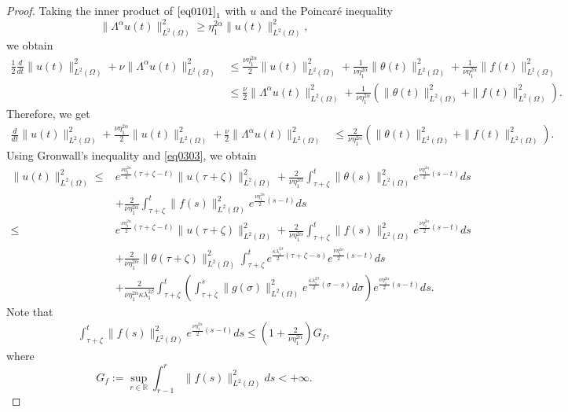 \documentclass[10pt,a4paper]{amsart}
\begin{document}
\begin{proof}
Taking the inner product of $\eqref{eq0101}_{1}$ with $u$ and the Poincar\'{e} inequality
$$\| \Lambda^\alpha u(t)\|_{L^2(\Omega)}^2 \geq \eta_1^{2\alpha}\|u(t)\|_{L^2(\Omega)}^2, $$
we obtain
\begin{align*}
   \frac{1}{2}\frac{d}{dt}\|u(t)\|_{L^2(\Omega)}^2 + \nu\|\Lambda^\alpha u(t)\|_{L^2(\Omega)}^2
   & \leq \frac{\nu\eta_1^{2\alpha}}{2} \|u(t)\|_{L^2(\Omega)}^2 + \frac{1}{\nu\eta_1^{2\alpha}} \|\theta(t)\|_{L^2(\Omega)}^2 + \frac{1}{\nu\eta_1^{2\alpha}} \|f(t)\|_{L^2(\Omega)}^2 \\
   & \leq \frac{\nu}{2} \|\Lambda^\alpha u(t)\|_{L^2(\Omega)}^2 + \frac{1}{\nu\eta_1^{2\alpha}} \left( \|\theta(t)\|_{L^2(\Omega)}^2 +    \|f(t)\|_{L^2(\Omega)}^2 \right).
\end{align*}
Therefore, we get
\begin{align}\label{eq0304}
   \frac{d}{dt}\|u(t)\|_{L^2(\Omega)}^2 + \frac{\nu\eta_1^{2\alpha}}{2} \|u(t)\|_{L^2(\Omega)}^2 + \frac{\nu}{2} \|\Lambda^\alpha u(t)\|_{L^2(\Omega)}^2
   & \leq \frac{2}{\nu\eta_1^{2\alpha}} \left( \|\theta(t)\|_{L^2(\Omega)}^2 +    \|f(t)\|_{L^2(\Omega)}^2 \right).
\end{align}
Using Gronwall's inequality and \cref{eq0303}, we obtain
\begin{align*} 
   \|u(t)\|_{L^2(\Omega)}^2
   \leq 
   & e^{\frac{\nu\eta_1^{2\alpha}}{2}(\tau+\zeta-t)} \|u(\tau+\zeta)\|_{L^2(\Omega)}^2 
   + \frac{2}{\nu\eta_1^{2\alpha}} \int_{\tau+\zeta}^{t} \|\theta(s)\|_{L^2(\Omega)}^2 e^{\frac{\nu\eta_1^{2\alpha}}{2}(s-t)} ds \\
   &+ \frac{2}{\nu\eta_1^{2\alpha}} \int_{\tau+\zeta}^{t}  \|f(s)\|_{L^2(\Omega)}^2 e^{\frac{\nu\eta_1^{2\alpha}}{2}(s-t)} ds \\
   \leq 
   & e^{\frac{\nu\eta_1^{2\alpha}}{2}(\tau+\zeta-t)} \|u(\tau+\zeta)\|_{L^2(\Omega)}^2 
   + \frac{2}{\nu\eta_1^{2\alpha}} \int_{\tau+\zeta}^{t}  \|f(s)\|_{L^2(\Omega)}^2 e^{\frac{\nu\eta_1^{2\alpha}}{2}(s-t)} ds \\
   &
   + \frac{2}{\nu\eta_1^{2\alpha}} \|\theta(\tau+\zeta)\|_{L^2(\Omega)}^2  \int_{\tau+\zeta}^{t} e^{\frac{\kappa\lambda_{1}^{2\beta}}{2}(\tau+\zeta-s)} e^{\frac{\nu\eta_1^{2\alpha}}{2}(s-t)} ds \\
   &
   + \frac{2}{\nu\eta_1^{2\alpha}\kappa\lambda_{1}^{2\beta}} \int_{\tau+\zeta}^{t} \left( \int_{\tau+\zeta}^{s} \|g(\sigma)\|_{L^2(\Omega)}^2 e^{\frac{\kappa\lambda_{1}^{2\beta}}{2}(\sigma-s)} d\sigma \right) e^{\frac{\nu\eta_1^{2\alpha}}{2}(s-t)} ds.
\end{align*}
Note that
\begin{align*}
   \int_{\tau+\zeta}^{t}  \|f(s)\|_{L^2(\Omega)}^2 e^{\frac{\nu\eta_1^{2\alpha}}{2}(s-t)} ds
   \leq \left(1+\frac{2}{\nu\eta_1^{2\alpha}}\right)G_f,
\end{align*}
where
$$G_f:=\sup_{r \in \mathbb{R}}\int_{r-1}^{r}\|f(s)\|_{L^2(\Omega)}^2 ds< +\infty.$$


\end{proof}
\end{document}
